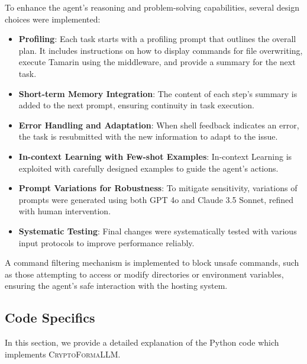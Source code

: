 To enhance the agent's reasoning and problem-solving capabilities, several design choices were implemented:
\begin{itemize} 
    \item \textbf{Profiling}: Each task starts with a profiling prompt that outlines the overall plan. It includes instructions on how to display commands for file overwriting, execute Tamarin using the middleware, and provide a summary for the next task.
    \item \textbf{Short-term Memory Integration}: The content of each step's summary is added to the next prompt, ensuring continuity in task execution.
    \item \textbf{Error Handling and Adaptation}: When shell feedback indicates an error, the task is resubmitted with the new information to adapt to the issue.
    \item \textbf{In-context Learning with Few-shot Examples}: In-context Learning is exploited with carefully designed examples to guide the agent's actions.
    \item \textbf{Prompt Variations for Robustness}: To mitigate sensitivity, variations of prompts were generated using both GPT 4o and Claude 3.5 Sonnet, refined with human intervention.
    \item \textbf{Systematic Testing}: Final changes were systematically tested with various input protocols to improve performance reliably. 
\end{itemize}

A command filtering mechanism is implemented to block unsafe commands, such as those attempting to access or modify directories or environment variables, ensuring the agent's safe interaction with the hosting system.
\label{sec:myagent}

\subsection{Code Specifics}
In this section, we provide a detailed explanation of the Python code which implements \textsc{CryptoFormaLLM}.
